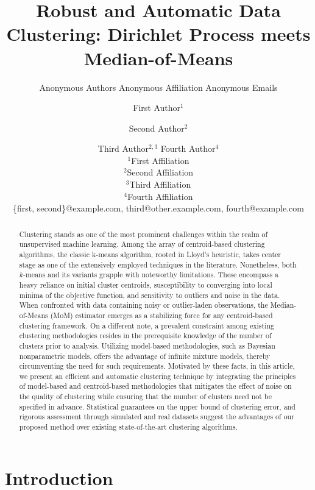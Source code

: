 \documentclass{article}
\title{Robust and Automatic Data Clustering: Dirichlet Process meets Median-of-Means}
\author{
    Anonymous Authors
    \affiliations
    Anonymous Affiliation
    \emails
    Anonymous Emails
}
\author{
First Author$^1$
\and
Second Author$^2$\and
Third Author$^{2,3}$\And
Fourth Author$^4$\\
\affiliations
$^1$First Affiliation\\
$^2$Second Affiliation\\
$^3$Third Affiliation\\
$^4$Fourth Affiliation\\
\emails
\{first, second\}@example.com,
third@other.example.com,
fourth@example.com
}
\begin{document}
\maketitle

\begin{abstract}
    Clustering stands as one of the most prominent challenges within the realm of unsupervised machine learning. Among the array of centroid-based clustering algorithms, the classic k-means algorithm, rooted in Lloyd's heuristic, takes center stage as one of the extensively employed techniques in the literature. Nonetheless, both $k$-means and its variants grapple with noteworthy limitations. These encompass a heavy reliance on initial cluster centroids, susceptibility to converging into local minima of the objective function, and sensitivity to outliers and noise in the data. When confronted with data containing noisy or outlier-laden observations, the Median-of-Means (MoM) estimator emerges as a stabilizing force for any centroid-based clustering framework. On a different note, a prevalent constraint among existing clustering methodologies resides in the prerequisite knowledge of the number of clusters prior to analysis. Utilizing model-based methodologies, such as Bayesian nonparametric models, offers the advantage of infinite mixture models, thereby circumventing the need for such requirements. Motivated by these facts, in this article, we present an efficient and automatic clustering technique by integrating the principles of model-based and centroid-based methodologies that mitigates the effect of noise on the quality of clustering while ensuring that the number of clusters need not be specified in advance. Statistical guarantees on the upper bound of clustering error, and rigorous assessment through simulated and real datasets suggest the advantages of our proposed method over existing state-of-the-art clustering algorithms.
\end{abstract}


\section{Introduction}
\label{sec:intro}
\end{document}
